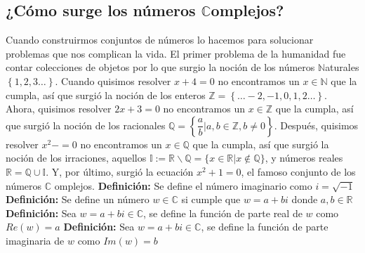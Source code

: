 \documentclass[12pt]{article}
\begin{document}
\subsection*{¿Cómo surge los números $\mathbb{C}$omplejos?}
Cuando construirmos conjuntos de números lo hacemos para solucionar problemas que nos complican la vida.
 El primer problema de la humanidad fue contar colecciones de objetos por lo que surgio la noción de los números 
$\mathbb{N}$aturales $\left\{1,2,3 \dots \right\} $.
\newline
\newline
Cuando quisimos resolver $x+4=0$ no encontramos un $x\in\mathbb{N}$ que la cumpla, así que surgió la noción de los enteros
$\mathbb{Z} = \left\{\dots-2,-1,0,1,2\dots\right\}$.
\newline
\newline
Ahora, quisimos resolver $2x+3=0$ no encontramos un $x\in\mathbb{Z}$ que la cumpla, así que surgió la noción de los racionales
$\mathbb{Q} = \left\{\dfrac{a}{b}|a,b\in\mathbb{Z}, b\not=0\right\}$.
\newline
\newline
Después, quisimos resolver $x^2-=0$ no encontramos un $x\in\mathbb{Q}$ que la cumpla, así que surgió la noción de los irraciones,
aquellos ${\mathbb {I} :=\mathbb {R} \backslash \mathbb {Q} =\{x\in \mathbb {R} |x\notin \mathbb {Q} \}}$,
y números reales $\mathbb{R} = \mathbb{Q}\cup\mathbb{I}$.
\newline
\newline
Y, por último, surgió la ecuación $x^2+1=0$, el famoso conjunto de los números $\mathbb{C}$ omplejos.
\newline
\newline
\textbf{Definición: }Se define el número imaginario como $i=\sqrt{-1}$
\newline
\newline
\textbf{Definición: }Se define un número $w\in\mathbb{C}$ si cumple que $w=a+bi$ donde $a,b\in\mathbb{R}$
\newline
\newline
\textbf{Definición: } Sea $w=a+bi \in\mathbb{C}$, se define la función de parte real de $w$ como $Re(w)=a$
\newline
\newline
\textbf{Definición: } Sea $w=a+bi \in\mathbb{C}$, se define la función de parte imaginaria de $w$ como $Im(w)=b$
\newline
\end{document}
